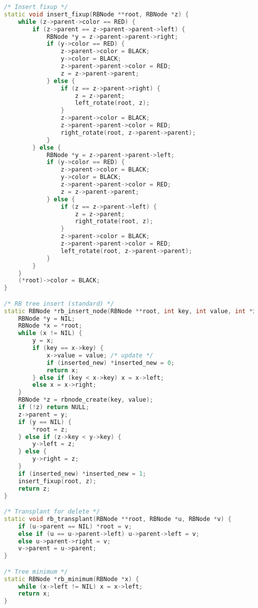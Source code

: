 \documentclass[12pt,a4paper]{article}
\begin{document}
\begin{lstlisting}[language=C++,caption=RBTree\_Hash.cpp]
/* Insert fixup */
static void insert_fixup(RBNode **root, RBNode *z) {
    while (z->parent->color == RED) {
        if (z->parent == z->parent->parent->left) {
            RBNode *y = z->parent->parent->right;
            if (y->color == RED) {
                z->parent->color = BLACK;
                y->color = BLACK;
                z->parent->parent->color = RED;
                z = z->parent->parent;
            } else {
                if (z == z->parent->right) {
                    z = z->parent;
                    left_rotate(root, z);
                }
                z->parent->color = BLACK;
                z->parent->parent->color = RED;
                right_rotate(root, z->parent->parent);
            }
        } else {
            RBNode *y = z->parent->parent->left;
            if (y->color == RED) {
                z->parent->color = BLACK;
                y->color = BLACK;
                z->parent->parent->color = RED;
                z = z->parent->parent;
            } else {
                if (z == z->parent->left) {
                    z = z->parent;
                    right_rotate(root, z);
                }
                z->parent->color = BLACK;
                z->parent->parent->color = RED;
                left_rotate(root, z->parent->parent);
            }
        }
    }
    (*root)->color = BLACK;
}

/* RB tree insert (standard) */
static RBNode *rb_insert_node(RBNode **root, int key, int value, int *inserted_new) {
    RBNode *y = NIL;
    RBNode *x = *root;
    while (x != NIL) {
        y = x;
        if (key == x->key) {
            x->value = value; /* update */
            if (inserted_new) *inserted_new = 0;
            return x;
        } else if (key < x->key) x = x->left;
        else x = x->right;
    }
    RBNode *z = rbnode_create(key, value);
    if (!z) return NULL;
    z->parent = y;
    if (y == NIL) {
        *root = z;
    } else if (z->key < y->key) {
        y->left = z;
    } else {
        y->right = z;
    }
    if (inserted_new) *inserted_new = 1;
    insert_fixup(root, z);
    return z;
}

/* Transplant for delete */
static void rb_transplant(RBNode **root, RBNode *u, RBNode *v) {
    if (u->parent == NIL) *root = v;
    else if (u == u->parent->left) u->parent->left = v;
    else u->parent->right = v;
    v->parent = u->parent;
}

/* Tree minimum */
static RBNode *rb_minimum(RBNode *x) {
    while (x->left != NIL) x = x->left;
    return x;
}


\end{lstlisting}
\end{document}
